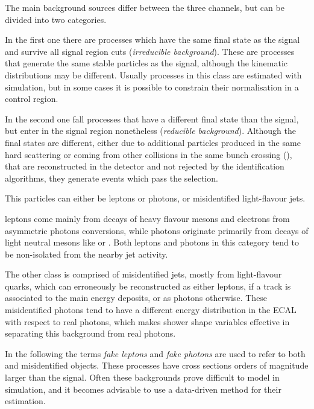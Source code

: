 \label{sec:backgrounds}
The main background sources differ between the three channels, but can be divided into two categories.

In the first one there are processes which have the same final state as the signal and survive all signal region cuts (\textit{irreducible background}).
These are processes that generate the same stable particles as the signal,
although the kinematic distributions may be different.
Usually processes in this class are estimated with simulation,
but in some cases it is possible to constrain their normalisation in a control region.

In the second one fall processes that have a different final state than the signal, but enter in the signal region nonetheless (\textit{reducible background}).
Although the final states are different,
either due to additional particles produced in the same hard scattering
or coming from other collisions in the same bunch crossing (\pileup),
that are reconstructed in the detector and not rejected by the identification algorithms,
they generate events which pass the selection.

This particles can either be \nonprompt leptons or photons, or misidentified light-flavour jets.

\Nonprompt leptons come mainly from decays of heavy flavour mesons and electrons from asymmetric photons conversions,
while \nonprompt photons originate primarily from decays of light neutral mesons like \PGpz or \PGh.
Both leptons and photons in this category tend to be non-isolated from the nearby jet activity.

The other class is comprised of misidentified jets, mostly from light-flavour quarks, which can erroneously be reconstructed as either leptons,
if a track is associated to the main energy deposits, or as photons otherwise.
These misidentified photons tend to have a different energy distribution in the ECAL with respect to real photons,
which makes shower shape variables effective in separating this background from real photons.

In the following the terms \textit{fake leptons} and \textit{fake photons} are used to refer to both \nonprompt and misidentified objects.
These processes have cross sections orders of magnitude larger than the signal.
Often these backgrounds prove difficult to model in simulation,
and it becomes advisable to use a data-driven method for their estimation.


